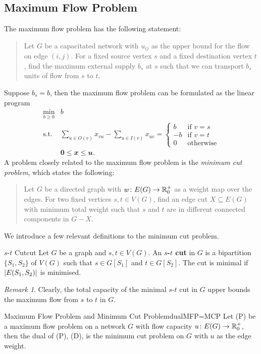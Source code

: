 \documentclass[math, code]{amznotes}
\theoremstyle{remark}
\newtheorem*{remark}{Remark}
\begin{document}
\subsection{Maximum Flow Problem}
The maximum flow problem has the following statement:
\begin{quote}
    Let $G$ be a capacitated network with $u_{ij}$ as the upper bound for the flow on edge $(i, j)$. For a fixed source vertex $s$ and a fixed destination vertex $t$, find the maximum external supply $b_s$ at $s$ such that we can transport $b_s$ units of flow from $s$ to $t$.
\end{quote}
Suppose $b_s = b$, then the maximum flow problem can be formulated as the linear program 
\begin{align*}
    \min_{b \geq 0} & b \\
    \textrm{s.t. } & \sum_{u \in O(v)}x_{vu} - \sum_{u \in I(v)}x_{uv} = \begin{cases}
        b & \textrm{if } v = s \\
        -b & \textrm{if } v = t \\
        0 & \textrm{otherwise}
    \end{cases} \\
    & \mathbf{0} \leq \mathbfit{x} \leq \mathbfit{u}. 
\end{align*}
A problem closely related to the maximum flow problem is the \textit{minimum cut problem}, which states the following:
\begin{quote}
    Let $G$ be a directed graph with $w \colon E(G) \to \mathbb{R}^+_0$ as a weight map over the edges. For two fixed vertices $s, t \in V(G)$, find an edge cut $X \subseteq E(G)$ with minimum total weight such that $s$ and $t$ are in different connected components in $G - X$.
\end{quote}
We introduce a few relevant definitions to the minimum cut problem.
\begin{dfnbox}{$s$-$t$ Cut}{cut}
    Let $G$ be a graph and $s, t \in V(G)$. An {\color{red} \textbf{$s$-$t$ cut}} in $G$ is a bipartition $\{S_1, S_2\}$ of $V(G)$ such that $s \in G[S_1]$ and $t \in G[S_2]$. The cut is minimal if ${\left\lvert {E(S_1, S_2)} \right\rvert}$ is minimised.
\end{dfnbox}
\begin{notebox}
    \begin{remark}
        Clearly, the total capacity of the minimal $s$-$t$ cut in $G$ upper bounds the maximum flow from $s$ to $t$ in $G$.
    \end{remark}
\end{notebox}
\begin{probox}{Maximum Flow Problem and Minimum Cut Problem}{dualMFP=MCP}
    Let (P) be a maximum flow problem on a network $G$ with flow capacity $u \colon E(G) \to \mathbb{R}^+_0$, then the dual of (P), (D), is the minimum cut problem on $G$ with $u$ as the edge weight.
\end{probox}
\end{document}
